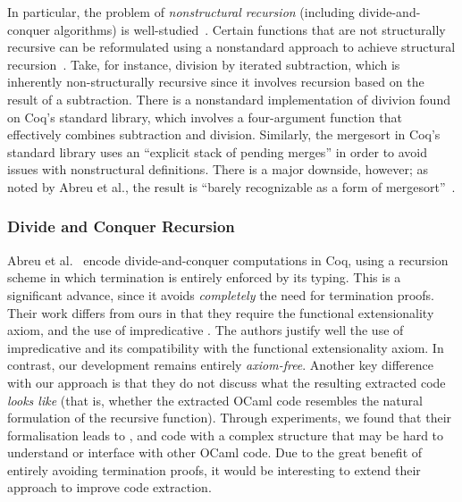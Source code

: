 \documentclass[ a4paper, UKenglish, cleveref, autoref, thm-restate]{lipics-v2021}
\begin{document}
In particular, the problem of \emph{nonstructural recursion} (including
divide-and-conquer algorithms) is well-studied~\cite{BoveKS16}.
Certain functions that are not structurally recursive can be reformulated using
a nonstandard approach to achieve structural recursion~\cite{AbreuDHJMS23}.
Take, for instance, division by iterated subtraction, which is inherently
non-structurally recursive since it involves recursion based on the result of a
subtraction. There is a nonstandard implementation of divivion found on Coq's
standard library, which involves a four-argument function that effectively
combines subtraction and division. Similarly, the mergesort in Coq's standard
library uses an ``explicit stack of pending merges'' in order to avoid issues
with nonstructural definitions. There is a major downside, however; as noted by
Abreu et al., the result is ``barely recognizable as a form of
mergesort''~\cite{AbreuDHJMS23}.
 
\subsubsection{Divide and Conquer Recursion}\label{sec:reccoq}

Abreu et al.~\cite{AbreuDHJMS23} encode divide-and-conquer computations in Coq,
using a recursion scheme in which termination is entirely enforced by its
typing.  This is a significant advance, since it avoids \emph{completely} the
need for termination proofs. Their work differs from ours in that they require
the functional extensionality axiom, and the use of impredicative .
The authors justify well the use of impredicative  and its
compatibility with the functional extensionality axiom. In contrast, our
development remains entirely \emph{axiom-free}. Another key difference with our
approach is that they do not discuss what the resulting extracted code
\emph{looks like} (that is, whether the extracted OCaml code resembles the
natural formulation of the recursive function). Through experiments, we found
that their formalisation leads to , and code with a complex
structure that may be hard to understand or interface with other OCaml code.
Due to the great benefit of entirely avoiding termination proofs, it would be
interesting to extend their approach to improve code extraction.
\end{document}
